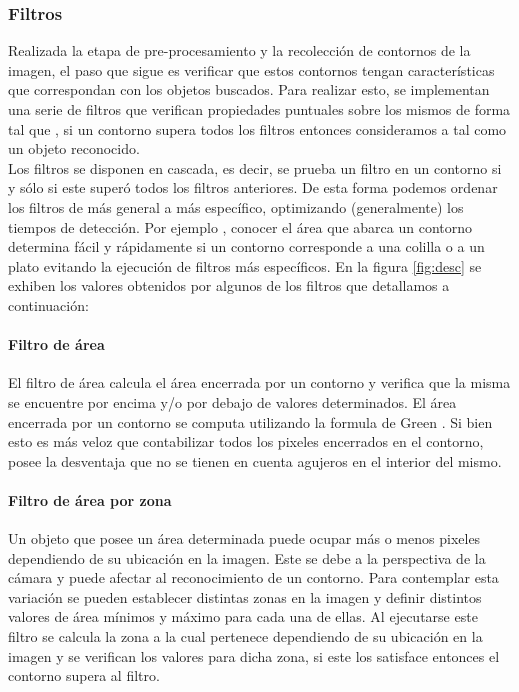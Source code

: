 	

	\subsubsection{\label{sec:filtros} Filtros}
	Realizada la etapa de pre-procesamiento y la recolecci\'on de contornos 
	de la imagen, el paso que sigue es verificar que estos
	contornos tengan caracter\'isticas que correspondan con  los 
	objetos buscados. Para realizar esto, se implementan una serie de filtros que verifican propiedades
	puntuales sobre los mismos de forma tal que , si un contorno supera todos los filtros entonces consideramos a tal como un objeto reconocido. \\
	\indent Los filtros se disponen en cascada, es decir, se prueba un 
	filtro en un contorno si y s\'olo si este super\'o todos los filtros 
	anteriores. De esta forma podemos ordenar los filtros de m\'as general 
	a m\'as espec\'ifico, optimizando (generalmente) los tiempos de detecci\'on. Por ejemplo , conocer 
	el \'area que abarca un contorno determina f\'acil y r\'apidamente si un contorno corresponde a una colilla o a un plato evitando la ejecuci\'on
	de filtros m\'as espec\'ificos. En la figura \ref{fig:desc} se exhiben 
	los valores obtenidos por algunos de los filtros que detallamos a 
	continuaci\'on:
	\paragraph{Filtro de \'area}
	El filtro de \'area calcula el \'area encerrada por un contorno y verifica que la misma se encuentre por encima y/o por debajo
	de valores determinados. El \'area encerrada por un contorno se computa utilizando la formula de Green \cite{greenwolfram}.
	Si bien esto es m\'as veloz que contabilizar todos los pixeles encerrados en el contorno, posee la desventaja que no se tienen en cuenta agujeros
	en el interior del mismo.
	\paragraph{Filtro de \'area por zona}
	Un objeto que posee un \'area determinada puede ocupar m\'as o menos pixeles dependiendo de su ubicaci\'on en la imagen. Este se debe a la 
	perspectiva de la c\'amara y puede afectar al reconocimiento de un contorno. Para contemplar esta variaci\'on se pueden establecer distintas
	zonas en la imagen y definir distintos valores de \'area m\'inimos y m\'aximo para cada una de ellas. Al ejecutarse este filtro se calcula la
	zona a la cual pertenece dependiendo de su ubicaci\'on en la imagen y se verifican los valores para dicha zona, si este los satisface entonces
	el contorno supera al filtro.

